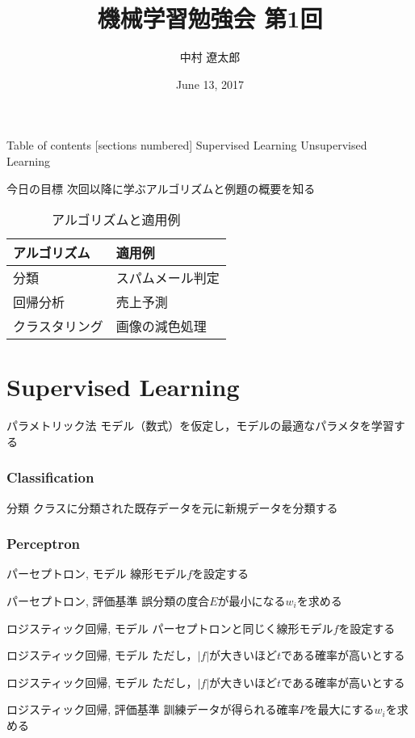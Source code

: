 \documentclass[dvipdfmx,platex]{beamer}
\title{{\mgfamily 機械学習勉強会 第1回}}
\date{June 13, 2017}
\author{{\mgfamily 中村 遼太郎}}
\institute{}
\begin{document}
\mgfamily
\maketitle
\begin{frame}{Table of contents}
  [sections numbered]
  Supervised Learning
  \tableofcontents[part=1]
  Unsupervised Learning
  \tableofcontents[part=2]
\end{frame}
\begin{frame}[fragile]{{\mgfamily 今日の目標}}
  次回以降に学ぶアルゴリズムと例題の概要を知る
  \begin{table}
    \caption{アルゴリズムと適用例}
    \begin{tabular}{@{} ll @{}}
      \toprule
      アルゴリズム & 適用例\\
      \midrule
      分類 & スパムメール判定\\
      回帰分析 & 売上予測\\
      クラスタリング & 画像の減色処理\\
      \bottomrule
    \end{tabular}
  \end{table}
\end{frame}
\part{Supervised Learning}
\begin{frame}{パラメトリック法}
  モデル（数式）を仮定し，モデルの最適なパラメタを学習する
\end{frame}
\section{Classification}
\begin{frame}{分類}
  クラスに分類された既存データを元に新規データを分類する
\end{frame}
\section{Perceptron}
\begin{frame}{パーセプトロン, モデル}
  線形モデル$f$を設定する
\end{frame}
\begin{frame}{パーセプトロン, 評価基準}
  誤分類の度合$E$が最小になる$w_i$を求める
\end{frame}
\begin{frame}{ロジスティック回帰, モデル}
  パーセプトロンと同じく線形モデル$f$を設定する
\end{frame}
\begin{frame}{ロジスティック回帰, モデル}
  ただし，$|f|$が大きいほど$t$である確率が高いとする
\end{frame}
\begin{frame}{ロジスティック回帰, モデル}
  ただし，$|f|$が大きいほど$t$である確率が高いとする
\end{frame}
\begin{frame}{ロジスティック回帰, 評価基準}
  訓練データが得られる確率$P$を最大にする$w_i$を求める
\end{frame}
\end{document}
